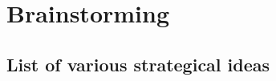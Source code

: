 \section{Brainstorming}
\label{sec:Section00}

\subsection{List of various strategical ideas}
\label{sec:Section00.a-}